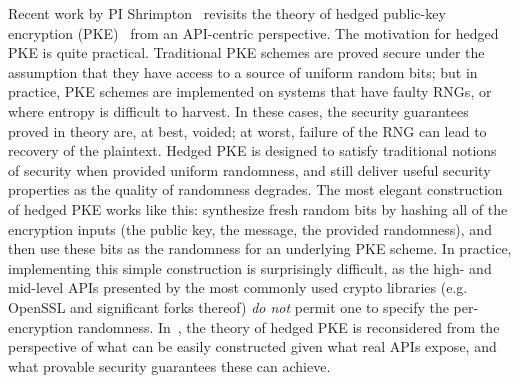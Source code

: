 %
Recent work by PI Shrimpton~\cite{BPS} revisits the theory of
hedged public-key encryption (PKE)~\cite{BBN+} from an API-centric perspective.
%
The motivation for hedged PKE is quite practical. Traditional
PKE schemes are proved secure under the assumption that they have access to a
source of uniform random bits; but in practice, PKE schemes are implemented on
systems that have faulty RNGs, or where entropy is difficult to harvest.  In
these cases, the security guarantees proved in theory are, at best, voided; at
worst, failure of the RNG can lead to recovery of the plaintext.
%
Hedged PKE is designed to satisfy traditional notions of security when provided
uniform randomness, and still deliver useful security properties as the quality
of randomness degrades.  The most elegant construction of hedged PKE works like
this: synthesize fresh random bits by hashing all of the encryption inputs (the
public key, the message, the provided randomness), and then use these bits as
the randomness for an underlying PKE scheme.  In practice, implementing this
simple construction is surprisingly difficult, as the high- and mid-level APIs
presented by the most commonly used crypto libraries (e.g. OpenSSL and
significant forks thereof) \emph{do not} permit one to specify the
per-encryption randomness.   In~\cite{BPS}, the theory of hedged PKE is
reconsidered from the perspective of what can be easily constructed given what
real APIs expose, and what provable security guarantees these can achieve.

